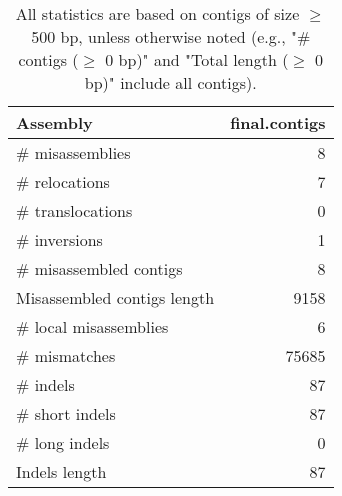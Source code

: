 \documentclass[12pt,a4paper]{article}
\begin{document}
\begin{table}[ht]
\begin{center}
\caption{All statistics are based on contigs of size $\geq$ 500 bp, unless otherwise noted (e.g., "\# contigs ($\geq$ 0 bp)" and "Total length ($\geq$ 0 bp)" include all contigs).}
\begin{tabular}{|l*{1}{|r}|}
\hline
Assembly & final.contigs \\ \hline
\# misassemblies & 8 \\ \hline
\hspace{5mm}\# relocations & 7 \\ \hline
\hspace{5mm}\# translocations & 0 \\ \hline
\hspace{5mm}\# inversions & 1 \\ \hline
\# misassembled contigs & 8 \\ \hline
Misassembled contigs length & 9158 \\ \hline
\# local misassemblies & 6 \\ \hline
\# mismatches & 75685 \\ \hline
\# indels & 87 \\ \hline
\hspace{5mm}\# short indels & 87 \\ \hline
\hspace{5mm}\# long indels & 0 \\ \hline
Indels length & 87 \\ \hline
\end{tabular}
\end{center}
\end{table}
\end{document}

